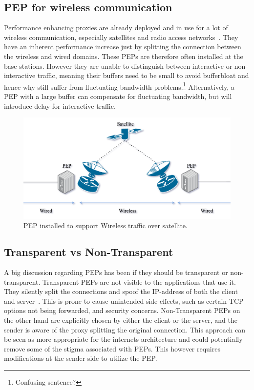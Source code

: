 \documentclass[a4paper,english, 11pt]{report}
\begin{document}
\subsection{PEP for wireless communication}
Performance enhancing proxies are already deployed and in use for a lot of wireless communication, especially satellites and radio access networks~\cite{tcp_mmwave_proxy}. They have an inherent performance increase just by splitting the connection between the wireless and wired domains. These PEPs are therefore often installed at the base stations. However they are unable to distinguish between interactive or non-interactive traffic, meaning their buffers need to be small to avoid bufferbloat and hence why still suffer from fluctuating bandwidth problems.\footnote{Confusing sentence?} Alternatively, a PEP with a large buffer can compensate for fluctuating bandwidth, but will introduce delay for interactive traffic.

\begin{figure}[h] %
	\centering
	\includegraphics[scale=0.50]{../diagrams/drawio/pep_satellite.png}
  	\caption{PEP installed to support Wireless traffic over satellite.}
  	\label{fig:blockage}
\end{figure}

\subsection{Transparent vs Non-Transparent}
A big discussion regarding PEPs has been if they should be transparent or non-transparent. Transparent PEPs are not visible to the applications that use it. They silently split the connections and spoof the IP-address of both the client and server~\cite{pep_dna}. This is prone to cause unintended side effects, such as certain TCP options not being forwarded, and security concerns. Non-Transparent PEPs on the other hand are explicitly chosen by either the client or the server, and the sender is aware of the proxy splitting the original connection. This approach can be seen as more appropriate for the internets architecture and could potentially remove some of the stigma associated with PEPs. This however requires modifications at the sender side to utilize the PEP.
\end{document}
